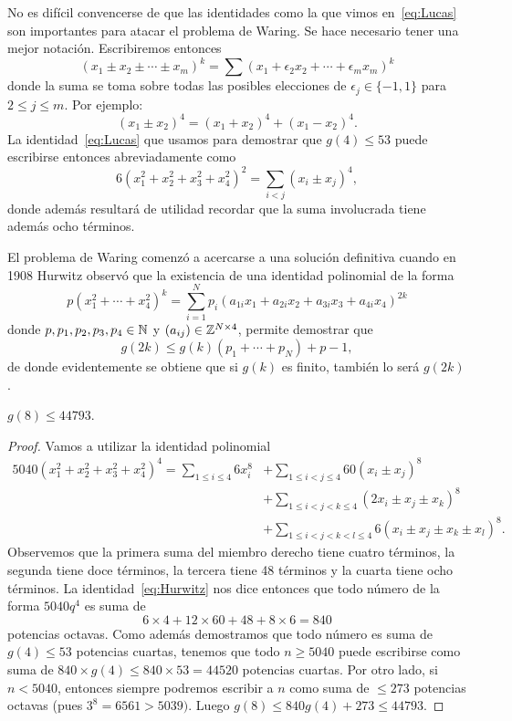 No es difícil convencerse de que las identidades como la que vimos
en~\eqref{eq:Lucas} son importantes para atacar el problema de Waring. Se hace
necesario tener una mejor notación. Escribiremos entonces 
\[
	(x_1\pm x_2\pm\cdots\pm x_m)^k=\sum(x_1+\epsilon_2x_2+\cdots+\epsilon_mx_m)^k
\]
donde la suma se toma sobre todas las posibles elecciones de  
$\epsilon_j\in\{-1,1\}$ para $2\leq j\leq m$. Por ejemplo:
\[
	(x_1\pm x_2)^4=(x_1+x_2)^4+(x_1-x_2)^4.
\]
La identidad~\eqref{eq:Lucas} que usamos para demostrar que $g(4)\leq 53$ puede
escribirse entonces abreviadamente como
\[
	6(x_1^2+x_2^2+x_3^2+x_4^2)^2=\sum_{i<j}(x_i\pm x_j)^4,
\]
donde además resultará de utilidad recordar que la suma involucrada tiene
además ocho términos.

El problema de Waring comenzó a acercarse a una solución definitiva cuando 
en 1908 Hurwitz observó que la existencia de una identidad polinomial
de la forma
\[
	p(x_1^2+\cdots+x_4^2)^k=\sum_{i=1}^N p_i(a_{1i}x_1+a_{2i}x_2+a_{3i}x_3+a_{4i}x_4)^{2k}
\]
donde $p,p_1,p_2,p_3,p_4\in\mathbb{N}$ y $(a_{ij})\in\mathbb{Z}^{N\times 4}$, permite
demostrar que 
\[
	g(2k)\leq g(k)(p_1+\cdots+p_N)+p-1,
\]
de donde evidentemente se obtiene que si $g(k)$ es finito, también lo será
$g(2k)$. 

\begin{theorem}[Hurwitz]
	$g(8)\leq 44793$. 
\end{theorem}

\begin{proof}
	Vamos a utilizar la identidad polinomial
	\begin{equation}
	\label{eq:Hurwitz}
	\begin{aligned}
		5040(x_1^2+x_2^2+x_3^2+x_4^2)^4= \sum_{1\leq i\leq 4}6x_i^8
		&+\sum_{1\leq i<j\leq 4}60(x_i\pm x_j)^8\\
		&+ \sum_{1\leq i<j<k\leq 4}(2x_i\pm x_j\pm x_k)^{8}\\
		&+\sum_{1\leq i<j<k<l\leq 4}6(x_i\pm x_j\pm x_k\pm x_l)^{8}.
	\end{aligned}
	\end{equation}
	Observemos que la primera suma del miembro derecho tiene cuatro términos,
	la segunda tiene doce términos, la tercera tiene 48 términos y la cuarta
	tiene ocho términos.  La identidad~\eqref{eq:Hurwitz} nos dice entonces que
	todo número de la forma $5040q^4$ es suma de 
	\[
		6\times 4+12\times 60+48+8\times 6=840
	\]
	potencias octavas. Como además demostramos que todo número es suma de
	$g(4)\leq 53$ potencias cuartas, tenemos que todo $n\geq 5040$ puede
	escribirse como suma de $840\times g(4)\leq 840\times 53=44520$ potencias
	cuartas. Por otro lado, si $n<5040$, entonces siempre podremos escribir a
	$n$ como suma de $\leq 273$ potencias octavas (pues $3^8=6561>5039)$. Luego 
	$g(8)\leq 840g(4)+273\leq 44793$.
\end{proof}

